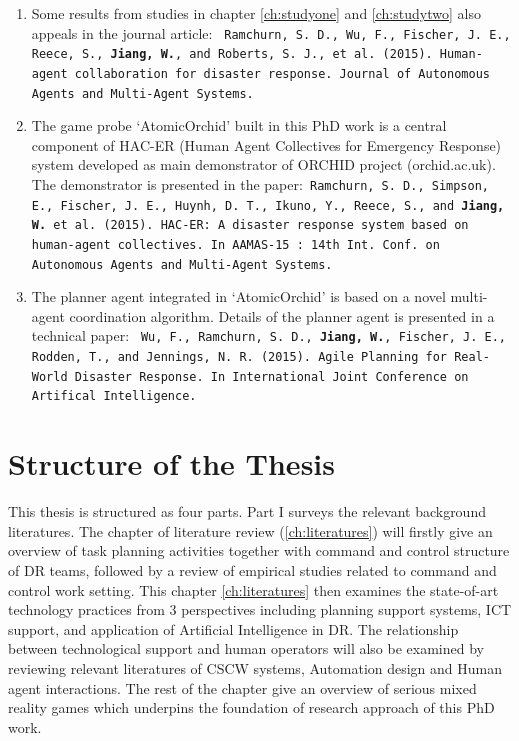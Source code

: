 \begin{enumerate}
\item Some results from studies in chapter \ref{ch:studyone} and \ref{ch:studytwo} also appeals in the journal article:
\texttt{ Ramchurn, S. D., Wu, F., Fischer, J. E., Reece, S., \textbf{Jiang, W.}, and Roberts, S. J., et al. (2015). Human-agent collaboration for disaster response. Journal of Autonomous Agents and Multi-Agent Systems.}\\

\item The game probe `AtomicOrchid' built in this PhD work is a central component of HAC-ER (Human Agent Collectives for Emergency Response) system  developed as main demonstrator of ORCHID project (orchid.ac.uk). The demonstrator is presented in the paper:\texttt{  Ramchurn, S. D., Simpson, E., Fischer, J. E., Huynh, D. T., Ikuno, Y., Reece, S., and \textbf{ Jiang, W.} et al. (2015). HAC-ER: A disaster response system based on human-agent collectives. In AAMAS-15 : 14th Int. Conf. on Autonomous Agents and Multi-Agent Systems.} \\ 

\item The planner agent integrated in `AtomicOrchid' is based on a novel multi-agent coordination algorithm. Details of the planner agent is presented in a technical paper: \texttt{ Wu, F., Ramchurn, S. D., \textbf{Jiang, W.}, Fischer, J. E., Rodden, T., and Jennings, N. R. (2015). Agile Planning for Real-World Disaster Response. In International Joint Conference on Artifical Intelligence.}

\end{enumerate} 

\section{Structure of the Thesis}
This thesis is structured as four parts. Part I surveys the relevant background literatures. The chapter of literature review (\ref{ch:literatures}) will firstly give an overview of task planning activities together with command and control structure of DR teams, followed by a review of empirical studies related to command and control work setting. This chapter \ref{ch:literatures} then examines the state-of-art technology practices from 3 perspectives including planning support systems, ICT support, and application of Artificial Intelligence in DR. The relationship between technological support and human operators will also be examined by reviewing relevant literatures of CSCW systems, Automation design and Human agent interactions. The rest of the chapter give an overview of serious mixed reality games which underpins the foundation of research approach of this PhD work.\\

